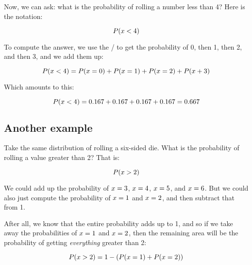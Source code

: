 \documentclass[../../../main.tex]{subfiles}
\begin{document}
Now, we can ask: what is the probability of rolling a number less than 4? Here is the notation:

\begin{equation*}
    \Probability{\RandVarVal/ < 4}
\end{equation*}

\noindent
To compute the answer, we use the \PDFtext/ to get the probability of 0, then 1, then 2, and then 3, and we add them up:

\begin{equation*}
    \Probability{\RandVarVal/ < 4} = \Probability{\RandVarVal/ = 0} + \Probability{\RandVarVal/ = 1} + \Probability{\RandVarVal/ = 2} + \Probability{\RandVarVal/ + 3}
\end{equation*}

\noindent
Which amounts to this:

\begin{equation*}
    \Probability{\RandVarVal/ < 4} = 0.167 + 0.167 + 0.167 + 0.167 = 0.667
\end{equation*}


\subsection{Another example}

Take the same distribution of rolling a six-sided die. What is the probability of rolling a value greater than 2? That is:

\begin{equation*}
  \Probability{\RandVarVal/ > 2}
\end{equation*}

\noindent
We could add up the probability of $\RandVarVal/ = 3$, $\RandVarVal/ = 4$, $\RandVarVal/ = 5$, and $\RandVarVal/ = 6$. But we could also just compute the probability of $\RandVarVal/ = 1$ and $\RandVarVal/ = 2$, and then subtract that from 1. 

After all, we know that the entire probability adds up to 1, and so if we take away the probabilities of $\RandVarVal/ = 1$ and $\RandVarVal/ = 2$, then the remaining area will be the probability of getting \emph{everything} greater than 2:

\begin{equation*}
  \Probability{\RandVarVal/ > 2} = 1 - (\Probability{\RandVarVal/ = 1} + \Probability{\RandVarVal/ = 2})
\end{equation*} 
\end{document}
